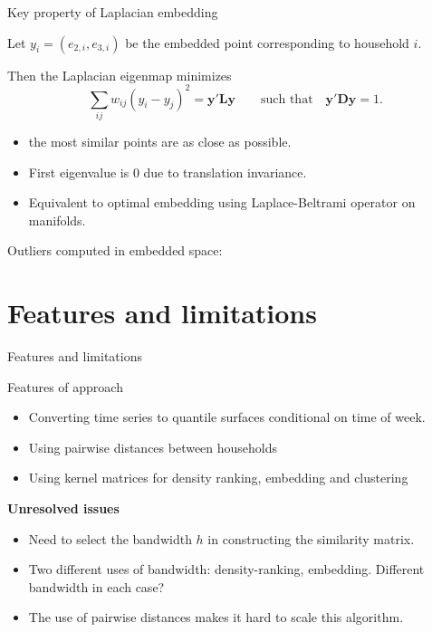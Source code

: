 \documentclass[14pt,ignorenonframetext,]{beamer}
\providecommand{\tightlist}{%
  \setlength{\itemsep}{0pt}\setlength{\parskip}{0pt}}
\begin{document}
\begin{frame}{Key property of Laplacian embedding}
\protect\hypertarget{key-property-of-laplacian-embedding}{}

Let \(y_i = (e_{2,i},e_{3,i})\) be the embedded point corresponding to
household \(i\).

\begin{block}{}
Then the Laplacian eigenmap minimizes
$$
  \sum_{ij} w_{ij}(y_i-y_j)^2 = \bm{y}'\bm{L}\bm{y} \qquad\text{such that}\quad
\bm{y}'\bm{D}\bm{y}=1.
$$
\end{block}\pause

\begin{itemize}[<+->]
\tightlist
\item
  the most similar points are as close as possible.
\item
  First eigenvalue is 0 due to translation invariance.
\item
  Equivalent to optimal embedding using Laplace-Beltrami operator on
  manifolds.
\end{itemize}

\end{frame}

\begin{frame}{Outliers computed in embedded space:}
\protect\hypertarget{outliers-computed-in-embedded-space}{}

\end{frame}

\hypertarget{features-and-limitations}{%
\section{Features and limitations}\label{features-and-limitations}}

\begin{frame}{Features and limitations}
\protect\hypertarget{features-and-limitations-1}{}

\fontsize{12}{13}\sf

\begin{block}{Features of approach}
\begin{itemize}
 \item Converting time series to quantile surfaces conditional on time of week.
 \item Using pairwise distances between households
 \item Using kernel matrices for density ranking, embedding and clustering
\end{itemize}
\end{block}\pause

\textbf{Unresolved issues}

\begin{itemize}
\tightlist
\item
  Need to select the bandwidth \(h\) in constructing the similarity
  matrix.
\item
  Two different uses of bandwidth: density-ranking, embedding. Different
  bandwidth in each case?
\item
  The use of pairwise distances makes it hard to scale this algorithm.
\end{itemize}

\end{frame}
\end{document}
